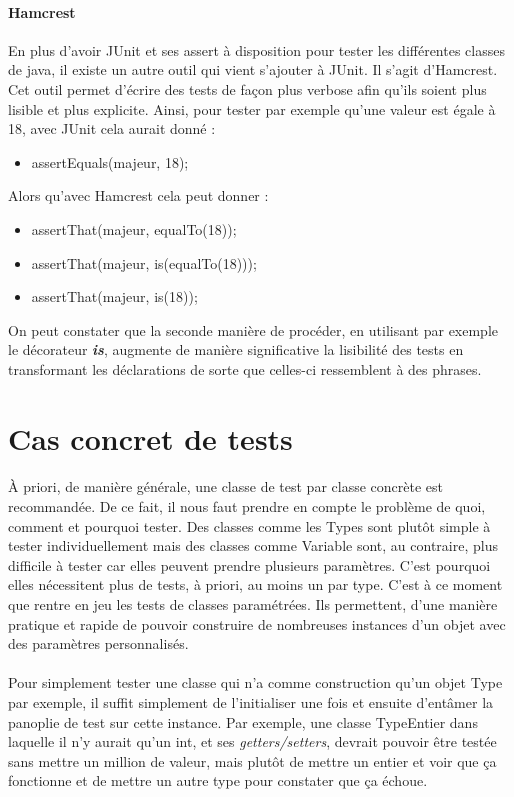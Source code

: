\paragraph{Hamcrest}
En plus d'avoir JUnit et ses assert à disposition pour tester les différentes classes de java, il existe un autre outil qui vient s'ajouter à JUnit. Il s'agit d'Hamcrest. Cet outil permet d'écrire des tests de façon plus verbose afin qu'ils soient plus lisible et plus explicite. Ainsi, pour tester par exemple qu'une valeur est égale à 18, avec JUnit cela aurait donné :
\begin{itemize}
    \item assertEquals(majeur, 18);
\end{itemize}
Alors qu'avec Hamcrest cela peut donner :
\begin{itemize}
    \item assertThat(majeur, equalTo(18));
    \item assertThat(majeur, is(equalTo(18)));
    \item assertThat(majeur, is(18));
\end{itemize}
On peut constater que la seconde manière de procéder, en utilisant par exemple le décorateur \textbf{\textit{is}}, augmente de manière significative la lisibilité des tests en transformant les déclarations de sorte que celles-ci ressemblent à des phrases.

\section{Cas concret de tests}
\paragraph{}
À priori, de manière générale, une classe de test par classe concrète est recommandée. De ce fait, il nous faut prendre en compte le problème de quoi, comment et pourquoi tester. Des classes comme les Types sont plutôt simple à tester individuellement mais des classes comme Variable sont, au contraire, plus difficile à tester car elles peuvent prendre plusieurs paramètres. C'est pourquoi elles nécessitent plus de tests, à priori, au moins un par type.
C'est à ce moment que rentre en jeu les tests de classes paramétrées. Ils permettent, d'une manière pratique et rapide de pouvoir construire de nombreuses instances d'un objet avec des paramètres personnalisés.

\paragraph{}
Pour simplement tester une classe qui n'a comme construction qu'un objet Type par exemple, il suffit simplement de l'initialiser une fois et ensuite d'entâmer la panoplie de test sur cette instance. Par exemple, une classe TypeEntier dans laquelle il n'y aurait qu'un int, et ses \textit{getters/setters}, devrait pouvoir être testée sans mettre un million de valeur, mais plutôt de mettre un entier et voir que ça fonctionne et de mettre un autre type pour constater que ça échoue.
